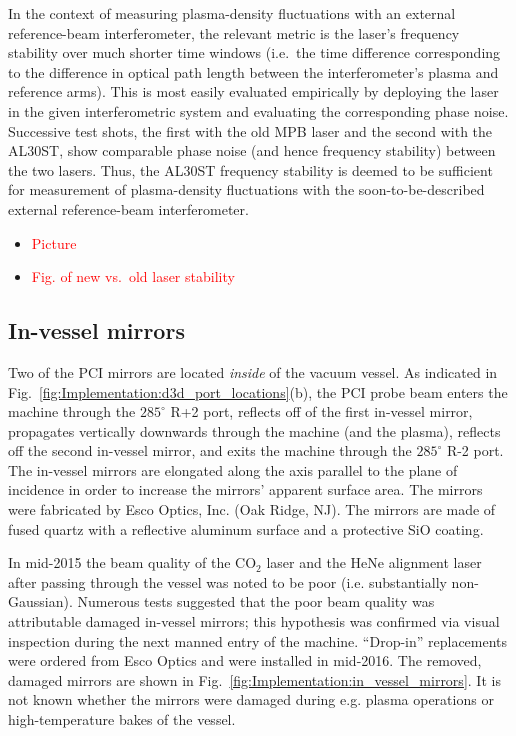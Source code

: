 In the context of measuring plasma-density fluctuations
with an external reference-beam interferometer,
the relevant metric is the laser's frequency stability
over much shorter time windows
(i.e.\ the time difference corresponding to
the difference in optical path length between
the interferometer's plasma and reference arms).
This is most easily evaluated empirically
by deploying the laser in the given interferometric system
and evaluating the corresponding phase noise.
Successive test shots,
the first with the old MPB laser and the second with the AL30ST,
show comparable phase noise (and hence frequency stability)
between the two lasers.
Thus, the AL30ST frequency stability is deemed to be sufficient
for measurement of plasma-density fluctuations
with the soon-to-be-described external reference-beam interferometer.

\begin{itemize}
  \item \textcolor{red}{Picture}
  \item \textcolor{red}{Fig. of new vs.\ old laser stability}
\end{itemize}


\subsection{In-vessel mirrors}
Two of the PCI mirrors are located
\emph{inside} of the \diiid \space vacuum vessel.
As indicated in Fig.~\ref{fig:Implementation:d3d_port_locations}(b),
the PCI probe beam enters the machine through the $285^{\circ}$ R+2 port,
reflects off of the first in-vessel mirror,
propagates vertically downwards through the machine (and the plasma),
reflects off the second in-vessel mirror, and
exits the machine through the $285^{\circ}$ R-2 port.
The in-vessel mirrors are elongated
along the axis parallel to the plane of incidence
in order to increase the mirrors' apparent surface area.
The mirrors were fabricated by Esco Optics, Inc. (Oak Ridge, NJ).
The mirrors are made of fused quartz with
a reflective aluminum surface and a protective SiO coating.

In mid-2015 the beam quality of the CO$_2$ laser and the HeNe alignment laser
after passing through the \diiid \space vessel was noted to be poor
(i.e. substantially non-Gaussian).
Numerous tests suggested that the poor beam quality was attributable
damaged in-vessel mirrors;
this hypothesis was confirmed via visual inspection
during the next manned entry of the machine.
``Drop-in'' replacements were ordered from Esco Optics
and were installed in mid-2016.
The removed, damaged mirrors are shown in
Fig.~\ref{fig:Implementation:in_vessel_mirrors}.
It is not known whether the mirrors were damaged
during e.g. plasma operations or high-temperature bakes of the vessel.

